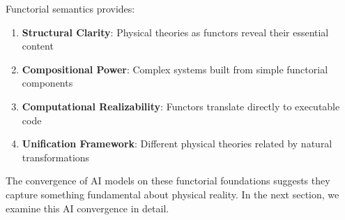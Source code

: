 Functorial semantics provides:

\begin{enumerate}[leftmargin=*]
\item \textbf{Structural Clarity}: Physical theories as functors reveal their essential content
\item \textbf{Compositional Power}: Complex systems built from simple functorial components
\item \textbf{Computational Realizability}: Functors translate directly to executable code
\item \textbf{Unification Framework}: Different physical theories related by natural transformations
\end{enumerate}

The convergence of AI models on these functorial foundations suggests they capture something fundamental about physical reality. In the next section, we examine this AI convergence in detail.